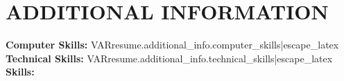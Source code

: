 \documentclass[10pt,letterpaper]{article}
\begin{document}
{{{%

\section*{ADDITIONAL INFORMATION}

\noindent\textbf{Computer Skills:} VAR{resume.additional_info.computer_skills|escape_latex}
\noindent\textbf{Technical Skills:} VAR{resume.additional_info.technical_skills|escape_latex}
\noindent\textbf{Skills:} %

}}}
\end{document}
